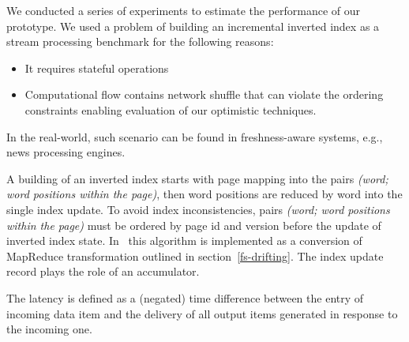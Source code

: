 
\label{fs-experiments-section}

We conducted a  series of experiments to estimate the performance of our  prototype. 
We used a problem of building an incremental inverted index as a stream processing benchmark  for the following reasons:

\begin{itemize}
    \item It requires stateful operations
    \item Computational flow contains network shuffle that can violate the ordering constraints %
    enabling evaluation of our optimistic techniques.
\end{itemize}

In the real-world, such scenario can be found in freshness-aware systems, e.g., news processing engines.

A building of an inverted index %
starts with page mapping into the pairs {\it (word; word positions within the page)}, then  word positions are reduced by word into the single index update. 
%
To avoid index inconsistencies, pairs {\it (word; word positions within the page)} must be ordered by page id and version before the update of inverted index state. 
In \FlameStream\ this algorithm is implemented as a conversion of MapReduce transformation 
outlined in  section~\ref{fs-drifting}.
The index update record plays the role of an accumulator. 

The latency is defined as a (negated) time difference between the entry of incoming data item and the delivery of all output items generated in response to the incoming one.


